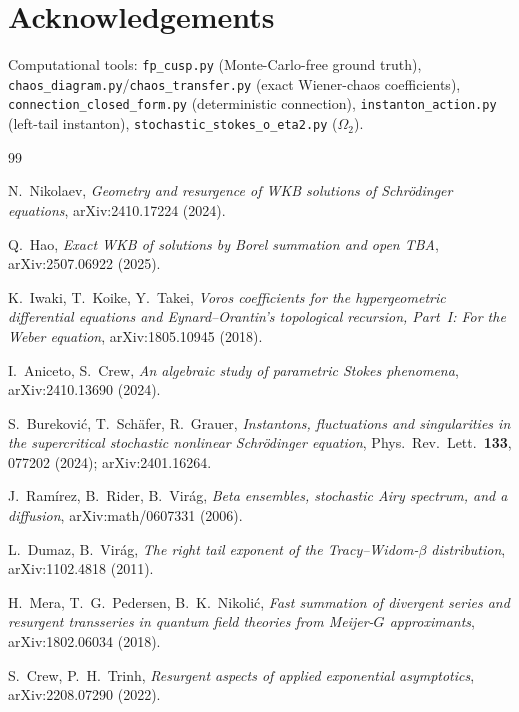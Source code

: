 \documentclass[11pt,reqno]{amsart}
\theoremstyle{plain}
\theoremstyle{definition}
\theoremstyle{remark}
\begin{document}
\section*{Acknowledgements}
Computational tools: \texttt{fp\_cusp.py} (Monte-Carlo-free ground truth),
\texttt{chaos\_diagram.py}/\texttt{chaos\_transfer.py} (exact Wiener-chaos coefficients),
\texttt{connection\_closed\_form.py} (deterministic connection),
\texttt{instanton\_action.py} (left-tail instanton),
\texttt{stochastic\_stokes\_o\_eta2.py} ($\Omega_2$).

\begin{thebibliography}{99}

 N.~Nikolaev, \emph{Geometry and resurgence of WKB solutions of Schr\"odinger
equations}, arXiv:2410.17224 (2024).

 Q.~Hao, \emph{Exact WKB of solutions by Borel summation and open TBA},
arXiv:2507.06922 (2025).

 K.~Iwaki, T.~Koike, Y.~Takei, \emph{Voros coefficients for the hypergeometric
differential equations and Eynard--Orantin's topological recursion, Part~I: For the Weber
equation}, arXiv:1805.10945 (2018).

 I.~Aniceto, S.~Crew, \emph{An algebraic study of parametric Stokes
phenomena}, arXiv:2410.13690 (2024).

 S.~Burekovi\'c, T.~Sch\"afer, R.~Grauer, \emph{Instantons, fluctuations and
singularities in the supercritical stochastic nonlinear Schr\"odinger equation}, Phys.\ Rev.\
Lett.\ \textbf{133}, 077202 (2024); arXiv:2401.16264.

 J.~Ram\'irez, B.~Rider, B.~Vir\'ag, \emph{Beta ensembles, stochastic Airy
spectrum, and a diffusion}, arXiv:math/0607331 (2006).

 L.~Dumaz, B.~Vir\'ag, \emph{The right tail exponent of the
Tracy--Widom-$\beta$ distribution}, arXiv:1102.4818 (2011).

 H.~Mera, T.~G.~Pedersen, B.~K.~Nikoli\'c, \emph{Fast summation of divergent series
and resurgent transseries in quantum field theories from Meijer-$G$ approximants},
arXiv:1802.06034 (2018).

 S.~Crew, P.~H.~Trinh, \emph{Resurgent aspects of applied exponential
asymptotics}, arXiv:2208.07290 (2022).

\end{thebibliography}
\end{document}
